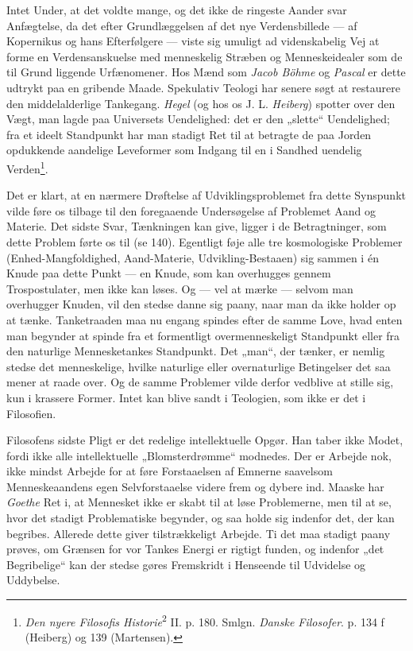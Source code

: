 \documentclass[12pt,a4paper]{book}
\newcommand{\apage}[1]{\marginnote{\footnotesize\textit{[#1]}}}
\begin{document}
\apage{343} Intet Under, at det voldte mange, og det ikke de ringeste Aander svar Anfægtelse, da det
efter Grundlæggelsen af det nye Verdensbillede --- af Kopernikus og hans Efterfølgere ---
viste sig umuligt ad videnskabelig Vej at forme en Verdensanskuelse med menneskelig Stræben
og Menneskeidealer som de til Grund liggende Urfænomener. Hos Mænd som \emph{Jacob Böhme} og
\emph{Pascal} er dette udtrykt paa en gribende Maade. Spekulativ Teologi har senere søgt at
restaurere den middelalderlige Tankegang. \emph{Hegel} (og hos os J. L. \emph{Heiberg})
spotter over den Vægt, man lagde paa Universets Uendelighed: det er den „slette“
Uendelighed; fra et ideelt Standpunkt har man stadigt Ret til at betragte de paa Jorden
opdukkende aandelige Leveformer som Indgang til en i Sandhed uendelig
Verden\footnote{\emph{Den nyere Filosofis Historie}\textsuperscript{2} II. p. 180. Smlgn.
\emph{Danske Filosofer}. p. 134 f (Heiberg) og 139 (Martensen).}.

Det er klart, at en nærmere Drøftelse af Udviklingsproblemet fra dette Synspunkt vilde føre
os tilbage til den foregaaende Undersøgelse af Problemet Aand og Materie. Det sidste Svar,
Tænkningen kan give, ligger i de Betragtninger, som dette Problem førte os til (se 140).
Egentligt føje alle tre kosmologiske Problemer (Enhed-Mangfoldighed, Aand-Materie,
Udvikling-Bestaaen) sig sammen i én Knude paa dette Punkt --- en Knude, som kan overhugges
gennem Trospostulater, men ikke kan løses. Og --- vel at mærke --- selvom man overhugger
Knuden, vil den stedse danne sig paany, naar man da ikke holder op at tænke. Tanketraaden
maa nu engang spindes efter de samme Love, hvad enten man begynder at spinde fra et
formentligt overmenneskeligt Standpunkt eller fra den naturlige Mennesketankes Standpunkt.
Det „man“, der tænker, er nemlig stedse det menneskelige, hvilke naturlige eller
overnaturlige Betingelser det saa mener at raade over. Og de samme Problemer vilde derfor
vedblive at stille sig, kun i krassere Former. Intet kan blive sandt i Teologien, som ikke
er det i Filosofien.

Filosofens sidste Pligt er det redelige intellektuelle Opgør. Han taber ikke Modet, fordi
ikke alle intellektuelle \apage{344} „Blomsterdrømme“ modnedes. Der er Arbejde nok, ikke mindst Arbejde
for at føre Forstaaelsen af Emnerne saavelsom Menneskeaandens egen Selvforstaaelse videre
frem og dybere ind. Maaske har \emph{Goethe} Ret i, at Mennesket ikke er skabt til at løse
Problemerne, men til at se, hvor det stadigt Problematiske begynder, og saa holde sig
indenfor det, der kan begribes. Allerede dette giver tilstrækkeligt Arbejde. Ti det maa
stadigt paany prøves, om Grænsen for vor Tankes Energi er rigtigt funden, og indenfor „det
Begribelige“ kan der stedse gøres Fremskridt i Henseende til Udvidelse og Uddybelse.
\end{document}
